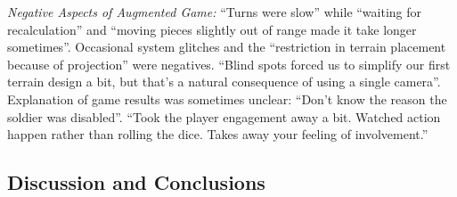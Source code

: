 {\em Negative Aspects of Augmented Game:} %
%
%
%
%
``Turns were slow'' while ``waiting for recalculation'' and
  ``moving pieces slightly out of range made it take longer
  sometimes''. 
%
%
Occasional system glitches and the ``restriction in terrain placement because of projection'' were negatives.
``Blind spots forced us to simplify our first terrain design a bit,
but that's a natural consequence of using a single camera''.
Explanation of game results was sometimes unclear: 
``Don't know the reason the soldier was disabled''.
%
``Took the player engagement away a bit.  Watched action happen rather
than rolling the dice.  Takes away your feeling of involvement.''


%
%
%
%


\subsection{Discussion and Conclusions}

